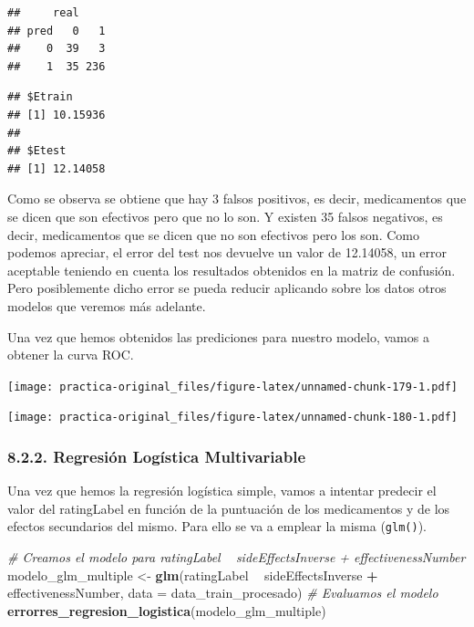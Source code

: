 \documentclass[spanish,]{article}
\newenvironment{Shaded}{\begin{snugshade}}{\end{snugshade}}
\newcommand{\KeywordTok}[1]{\textcolor[rgb]{0.13,0.29,0.53}{\textbf{#1}}}
\newcommand{\DataTypeTok}[1]{\textcolor[rgb]{0.13,0.29,0.53}{#1}}
\newcommand{\StringTok}[1]{\textcolor[rgb]{0.31,0.60,0.02}{#1}}
\newcommand{\CommentTok}[1]{\textcolor[rgb]{0.56,0.35,0.01}{\textit{#1}}}
\newcommand{\OperatorTok}[1]{\textcolor[rgb]{0.81,0.36,0.00}{\textbf{#1}}}
\newcommand{\NormalTok}[1]{#1}
\begin{document}
\begin{verbatim}
##     real
## pred   0   1
##    0  39   3
##    1  35 236
\end{verbatim}

\begin{verbatim}
## $Etrain
## [1] 10.15936
## 
## $Etest
## [1] 12.14058
\end{verbatim}

Como se observa se obtiene que hay 3 falsos positivos, es decir,
medicamentos que se dicen que son efectivos pero que no lo son. Y
existen 35 falsos negativos, es decir, medicamentos que se dicen que no
son efectivos pero los son. Como podemos apreciar, el error del test nos
devuelve un valor de 12.14058, un error aceptable teniendo en cuenta los
resultados obtenidos en la matriz de confusión. Pero posiblemente dicho
error se pueda reducir aplicando sobre los datos otros modelos que
veremos más adelante.

Una vez que hemos obtenidos las prediciones para nuestro modelo, vamos a
obtener la curva ROC.

\texttt{[image: practica-original\_files/figure-latex/unnamed-chunk-179-1.pdf]}

\texttt{[image: practica-original\_files/figure-latex/unnamed-chunk-180-1.pdf]}

\subsubsection{8.2.2. Regresión Logística
Multivariable}\label{regresion-logistica-multivariable}

Una vez que hemos la regresión logística simple, vamos a intentar
predecir el valor del ratingLabel en función de la puntuación de los
medicamentos y de los efectos secundarios del mismo. Para ello se va a
emplear la misma (\texttt{glm()}).

\begin{Shaded}
\begin{Highlighting}[]
\CommentTok{# Creamos el modelo para ratingLabel ~ sideEffectsInverse + effectivenessNumber}
\NormalTok{modelo_glm_multiple <-}\StringTok{ }\KeywordTok{glm}\NormalTok{(ratingLabel }\OperatorTok{~}\StringTok{ }\NormalTok{sideEffectsInverse }\OperatorTok{+}\StringTok{ }\NormalTok{effectivenessNumber, }\DataTypeTok{data =}\NormalTok{ data_train_procesado)}
\CommentTok{# Evaluamos el modelo}
\KeywordTok{errorres_regresion_logistica}\NormalTok{(modelo_glm_multiple)}
\end{Highlighting}
\end{Shaded}
\end{document}
